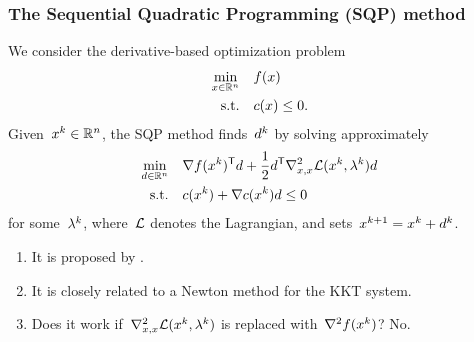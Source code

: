 \documentclass{polyu-presentation}
\newcommand{\con}[1][]{c\ifthenelse{\equal{#1}{}}{}{_{#1}}}
\newcommand{\iter}[1][]{x\ifthenelse{\equal{#1}{}}{}{^{#1}}}
\newcommand{\lag}[1][]{\mathcal{L}\ifthenelse{\equal{#1}{}}{}{^{#1}}}
\newcommand{\lm}[1][]{\lambda\ifthenelse{\equal{#1}{}}{}{^{#1}}}
\newcommand{\obj}{f}
\newcommand{\step}[1][]{d\ifthenelse{\equal{#1}{}}{}{^{#1}}}
\begin{document}
\begin{frame}
    \frametitle{The Sequential Quadratic Programming (SQP) method}

    We consider the \alert{derivative-based} optimization problem
    \setlength{\abovedisplayskip}{7pt}
    \setlength{\belowdisplayskip}{7pt}
    \begin{align*}
        \min_{\iter \in \R^n}   & \quad \obj(\iter)\\
        \text{s.t.}             & \quad \con(\iter) \le 0.
    \end{align*}
	Given~$\iter[k] \in \R^n$, the \alert{SQP method} finds~$\step[k]$ by solving approximately
    \begin{align*}
        \min_{\step \in \R^n}   & \quad \nabla \obj(\iter[k])^{\T} \step + \frac{1}{2} \step^{\T} \nabla_{x, x}^2 \lag(\iter[k], \lm[k]) \step\\
        \text{s.t.}             & \quad \con(\iter[k]) + \nabla \con(\iter[k]) \step \le 0
    \end{align*}
    for some~$\lm[k]$, where~$\lag$ denotes the \alert{Lagrangian}, and sets~$\iter[k + 1] = \iter[k] + \step[k]$.

    \begin{block}{}
        \begin{enumerate}
            \item It is proposed by \textcite{Wilson_1963,Han_1976,Han_1977,Powell_1978a,Powell_1978b,Powell_1978c}.
            \item It is closely related to a \alert{Newton} method for the KKT system.
            \item Does it work if~$\nabla_{x, x}^2 \lag(\iter[k], \lm[k])$ is replaced with~$\nabla^2 \obj(\iter[k])$?
            \pause
            \alert{No}.
        \end{enumerate}
    \end{block}
\end{frame}
\end{document}
